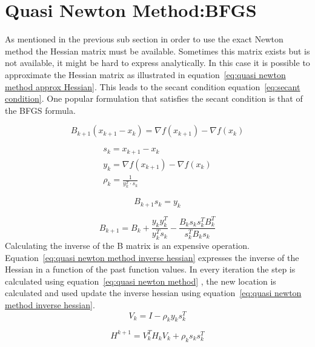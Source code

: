 	\section{Quasi Newton Method:BFGS}
	As mentioned in the previous sub section in order to use the exact Newton method the Hessian matrix must be available. Sometimes this matrix exists but is not available, it might be hard to express analytically. In this case it is possible to approximate the Hessian matrix as illustrated in equation~\ref{eq:quasi newton method approx Hessian}. This leads to the secant condition equation~\ref{eq:secant condition}. One popular formulation that satisfies the secant condition is that of the BFGS formula.
		
		\begin{equation}
			B_{k+1}(x_{k+1}-x_k) = \nabla f(x_{k+1}) - \nabla f(x_k)
			\label{eq:quasi newton method approx Hessian}	
		\end{equation}
		
		\begin{eqnarray}
			s_k = x_{k+1} - x_{k} \\
			y_k = \nabla f(x_{k+1}) - \nabla f(x_{k}) \\
			\rho_k = \frac{1}{y_k^T \cdot s_k}
		\end{eqnarray}
	
		
		\begin{equation}
			B_{k+1} s_{k} = y_{k}
			\label{eq:secant condition}
		\end{equation}
		
		\begin{equation}
			B_{k+1} = B_{k} + \frac{y_k y_k^T}{ y_k^T s_k} - \frac{B_k s_k s_k^T B_k^T}{s_k^TB_ks_k}
			\label{eq:quasi newton method approx Hessian with past values}
		\end{equation}
	Calculating the inverse of the B matrix is an expensive operation. Equation~\ref{eq:quasi newton method inverse hessian} expresses the inverse of the Hessian in a function of the past function values. In every iteration the step is calculated using equation~\ref{eq:quasi newton method} , the new location is calculated and used update the inverse hessian using equation~\ref{eq:quasi newton method inverse hessian}.
		\begin{equation}
			V_k = I - \rho_ky_ks_k^T
		\end{equation}
	
		\begin{equation}
			H^{k+1} = V_k^TH_kV_k + \rho_ks_ks_k^T
			\label{eq:quasi newton method inverse hessian}	
		\end{equation}
		
